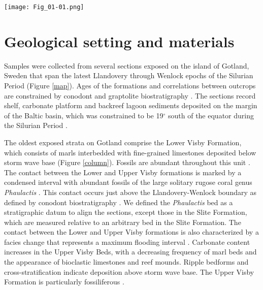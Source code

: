 \documentclass[5p, authoryear]{elsarticle}
\begin{document}
\begin{figure*}[t]
\centering
\texttt{[image: Fig\_01-01.png]}
\caption{Geologic map of the northern half of the island of Gotland, Sweden, modified from \cite{Calner2004a}. Locations of stratigraphic sections are marked and labeled with location number, which corresponds to the sample locations in Supplementary Table 1.}
\label{map}
\end{figure*}

\section{Geological setting and materials}

Samples were collected from several sections exposed on the island of Gotland, Sweden that span the latest Llandovery through Wenlock epochs of the Silurian Period (Figure \ref{map}). Ages of the formations and correlations between outcrops are constrained by conodont and graptolite biostratigraphy \citep{Jeppsson2006}. The sections record shelf, carbonate platform and backreef lagoon sediments deposited on the margin of the Baltic basin, which was constrained to be 19$^{\circ}$ south of the equator during the Silurian Period \citep{Torsvik1992}. 

The oldest exposed strata on Gotland comprise the Lower Visby Formation, which consists of marls interbedded with fine-grained limestones deposited below storm wave base (Figure \ref{column}). Fossils are abundant throughout this unit \citep{Calner2004a, Samtleben1996}. The contact between the Lower and Upper Visby formations is marked by a condensed interval with abundant fossils of the large solitary rugose coral genus \textit{Phaulactis} \citep{Jeppsson1997, Jeppsson2006, Munnecke2003, Samtleben1996}. This contact occurs just above the Llandovery-Wenlock boundary as defined by conodont biostratigraphy \citep{Aldridge1993, Jeppsson1983, Mabillard1985}. We defined the \textit{Phaulactis} bed as a stratigraphic datum to align the sections, except those in the Slite Formation, which are measured relative to an arbitrary bed in the Slite Formation. The contact between the Lower and Upper Visby formations is also characterized by a facies change that represents a maximum flooding interval \citep{Calner2004b}. Carbonate content increases in the Upper Visby Beds, with a decreasing frequency of marl beds and the appearance of bioclastic limestones and reef mounds. Ripple bedforms and cross-stratification indicate deposition above storm wave base. The Upper Visby Formation is particularly fossiliferous \citep{Calner2004a, Samtleben1996}.  
\end{document}
